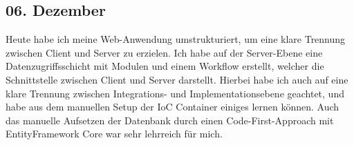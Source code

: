 \subsection{06. Dezember}
Heute habe ich meine Web-Anwendung umstrukturiert, um eine klare Trennung zwischen Client und Server zu erzielen. Ich habe auf der Server-Ebene eine Datenzugriffsschicht mit Modulen und einem Workflow erstellt, welcher die Schnittstelle zwischen Client und Server darstellt. Hierbei habe ich auch auf eine klare Trennung zwischen Integrations- und Implementationsebene geachtet, und habe aus dem manuellen Setup der IoC Container einiges lernen können. Auch das manuelle Aufsetzen der Datenbank durch einen Code-First-Approach mit EntityFramework Core war sehr lehrreich für mich.
